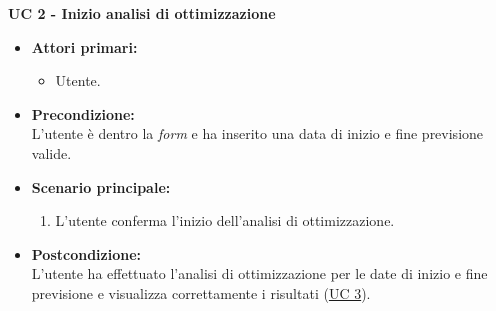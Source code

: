 \vspace{0.4cm}

\noindent \textbf{\large UC 2 - Inizio analisi di ottimizzazione}
\label{uc:inizio-analisi-ottimizzazione}
\begin{itemize}

	\item \textbf{Attori primari: }
		\begin{itemize}
			\item Utente.
		\end{itemize}

	\item \textbf{Precondizione: }\\[0.3cm]
		L'utente è dentro la \textit{form} e ha inserito una data di inizio e fine previsione valide.

	\item \textbf{Scenario principale: }
		\begin{enumerate}
			\item L'utente conferma l'inizio dell'analisi di ottimizzazione.
		\end{enumerate}
		

	\item \textbf{Postcondizione: }\\[0.3cm]
		L'utente ha effettuato l'analisi di ottimizzazione per le date di inizio e fine previsione e visualizza correttamente i
		risultati (\hyperref[uc:visualizzazione-risultati]{UC 3}).

\end{itemize}

\vspace{0.4cm}

